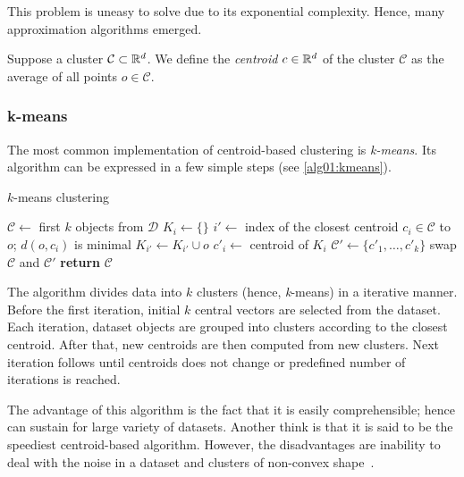 This problem is uneasy to solve due to its exponential complexity. Hence, many approximation algorithms emerged. 

\begin{defn}
	Suppose a cluster $\mathcal{C} \subset \mathbb{R}^d$. We define the \emph{centroid} $c \in \mathbb{R}^d$ of the cluster $\mathcal{C}$ as the average of all points $o \in \mathcal{C}$. 
	\label{def01:centr}
\end{defn}

\subsubsection{k-means}

The most common implementation of centroid-based clustering is \emph{k-means}. Its algorithm can be expressed in a few simple steps (see \ref{alg01:kmeans}).

\begin{algorithm}
	\caption{$k$-means clustering}
	\label{alg01:kmeans}
	\begin{algorithmic}[1]
		\State $\mathcal{C} \gets$ first $k$ objects from  $\mathcal{D}$ 
		\Repeat
				\State $K_i \gets \{\}$
			\EndFor
				\State $i' \gets$ index of the closest centroid $c_i \in \mathcal{C}$ to $o$; $d(o,c_i)$ is minimal
				\State $K_{i'} \gets K_{i'} \cup o$ 
			\EndFor
				\State $c'_i \gets$ centroid of $K_i$ 
			\EndFor
			\State $\mathcal{C}' \gets \{c'_1,\dots,c'_k\}$
			\State swap $\mathcal{C}$ and $\mathcal{C}'$
		\State \textbf{return} $\mathcal{C}$
		\EndProcedure
	\end{algorithmic}
\end{algorithm}


The algorithm divides data into $k$ clusters (hence, \emph{k}-means) in a iterative manner. Before the first iteration, initial $k$ central vectors are selected from the dataset. Each iteration, dataset objects are grouped into clusters according to the closest centroid. After that, new centroids are then computed from new clusters. Next iteration follows until centroids does not change or predefined number of iterations is reached. 

The advantage of this algorithm is the fact that it is easily comprehensible; hence can sustain for large variety of datasets. Another think is that it is said to be the speediest centroid-based algorithm. However, the disadvantages are inability to deal with the noise in a dataset and clusters of non-convex shape~\cite{uppada2014centroid}.
  

